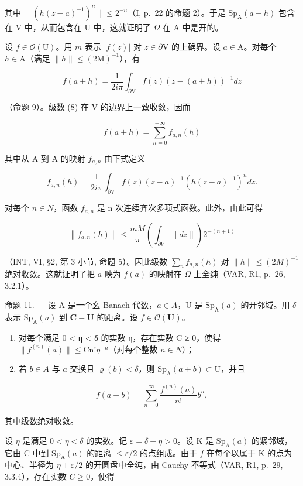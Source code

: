 其中 \(\| (h(z - a)^{-1})^n\| \leqslant 2^{-n}\)（I, p.~22 的命题 2）。于是 \(\mathrm{Sp}_{\mathrm{A}}(a + h)\) 包含在 V 中，从而包含在 U 中，这就证明了 \(\Omega\) 在 A 中是开的。

设 \(f \in \mathcal{O}(\mathrm{U})\)。用 \(m\) 表示 \(|f(z)|\) 对 \(z \in \partial \mathrm{V}\) 的上确界。设 \(a \in \mathrm{A}\)。对每个 \(h \in \mathrm{A}\)（满足 \(\| h \| \leqslant (2\mathrm{M})^{-1}\)），有

\[
f (a + h) = \frac {1}{2 i \pi} \int_ {\partial \mathrm{V}} f (z) (z - (a + h)) ^ {- 1} d z
\]

（命题 9）。级数 (8) 在 V 的边界上一致收敛，因而

\[
f (a + h) = \sum_ {n = 0} ^ {+ \infty} f _ {a, n} (h)
\]

其中从 A 到 A 的映射 \(f_{a,n}\) 由下式定义

\[
f _ {a, n} (h) = \frac {1}{2 i \pi} \int_ {\partial \mathrm{V}} f (z) (z - a) ^ {- 1} (h (z - a) ^ {- 1}) ^ {n} d z.
\]

对每个 \(n \in N\)，函数 \(f_{a,n}\) 是 n 次连续齐次多项式函数。此外，由此可得

\[
\left\| f _ {a, n} (h) \right\| \leqslant \frac {m M}{\pi} \left(\int_ {\partial V} \| d z \|\right) 2 ^ {- (n + 1)}
\]

（INT, VI, §2, 第 3 小节, 命题 5）。因此级数 \(\sum_{n} f_{a,n}(h)\) 对 \(\|h\| \leqslant (2M)^{-1}\) 绝对收敛。这就证明了把 \(a\) 映为 \(f(a)\) 的映射在 \(\Omega\) 上全纯（VAR, R1, p.~26, 3.2.1）。

命题 11. --- 设 A 是一个幺 Banach 代数，\(a \in A\)，U 是 \(\mathrm{Sp}_{\mathrm{A}}(a)\) 的开邻域。用 \(\delta\) 表示 \(\mathrm{Sp}_{\mathrm{A}}(a)\) 到 \(\mathbf{C} - \mathbf{U}\) 的距离。设 \(f \in \mathcal{O}(\mathbf{U})\)。

\begin{enumerate}
\def\labelenumi{\alph{enumi})}
\item
  对每个满足 0 \textless{} η \textless{} δ 的实数 η，存在实数 C ≥ 0，使得 \(\|f^{(n)}(a)\| \leqslant \mathrm{Cn}!\eta^{-n}\)（对每个整数 \(n \in N\)）；
\item
  若 \(b \in A\) 与 \(a\) 交换且 \(\varrho(b) < \delta\)，则 \(\mathrm{Sp}_{\mathrm{A}}(a + b) \subset \mathrm{U}\)，并且
\end{enumerate}

\[
f (a + b) = \sum_ {n = 0} ^ {\infty} \frac {f ^ {(n)} (a)}{n !} b ^ {n},
\]

其中级数绝对收敛。

设 \(\eta\) 是满足 \(0 < \eta < \delta\) 的实数。记 \(\varepsilon = \delta - \eta > 0\)。设 K 是 \(\mathrm{Sp}_{\mathrm{A}}(a)\) 的紧邻域，它由 C 中到 \(\mathrm{Sp}_{\mathrm{A}}(a)\) 的距离 \(\leqslant \varepsilon / 2\) 的点组成。由于 \(f\) 在每个以属于 K 的点为中心、半径为 \(\eta + \varepsilon / 2\) 的开圆盘中全纯，由 Cauchy 不等式（VAR, R1, p.~29, 3.3.4），存在实数 \(C \geqslant 0\)，使得

